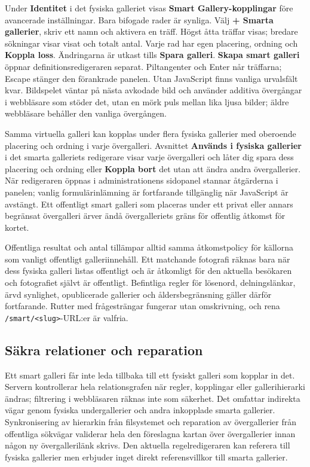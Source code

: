 \documentclass[11pt,a4paper]{article}
\newcommand{\ui}[1]{\textbf{#1}}
\begin{document}
Under \ui{Identitet} i det fysiska galleriet visas \ui{Smart Gallery-kopplingar}
före avancerade inställningar. Bara bifogade rader är synliga.
Välj \ui{+ Smarta gallerier}, skriv ett namn och aktivera en träff.
Högst åtta träffar visas; bredare sökningar visar visat och totalt antal.
Varje rad har egen placering, ordning och \ui{Koppla loss}.
Ändringarna är utkast tills \ui{Spara galleri}. \ui{Skapa smart galleri} öppnar
definitionsredigeraren separat. Piltangenter och Enter når
träffarna; Escape stänger den förankrade panelen. Utan JavaScript finns vanliga
urvalsfält kvar. Bildspelet väntar på nästa avkodade bild och använder additiva
övergångar i webbläsare som stöder det, utan en mörk puls mellan lika ljusa
bilder; äldre webbläsare behåller den vanliga övergången.

Samma virtuella galleri kan kopplas under flera fysiska gallerier med oberoende
placering och ordning i varje övergalleri. Avsnittet \ui{Används i fysiska
gallerier} i det smarta galleriets redigerare visar varje övergalleri och låter
dig spara dess placering och ordning eller \ui{Koppla bort} det utan att ändra
andra övergallerier. När redigeraren öppnas i administrationens sidopanel
stannar åtgärderna i panelen; vanlig formulärinlämning är fortfarande
tillgänglig när JavaScript är avstängt. Ett offentligt smart galleri som
placeras under ett privat eller annars begränsat övergalleri ärver ändå
övergalleriets gräns för offentlig åtkomst för kortet.

Offentliga resultat och antal tillämpar alltid samma åtkomstpolicy för källorna
som vanligt offentligt galleriinnehåll. Ett matchande fotografi räknas bara när
dess fysiska galleri listas offentligt och är åtkomligt för den aktuella
besökaren och fotografiet självt är offentligt. Befintliga regler för lösenord,
delningslänkar, ärvd synlighet, opublicerade gallerier och åldersbegränsning
gäller därför fortfarande. Rutter med frågesträngar fungerar utan omskrivning,
och rena \texttt{/smart/<slug>}-URL:er är valfria.

\subsection{Säkra relationer och reparation}

Ett smart galleri får inte leda tillbaka till ett fysiskt galleri som kopplar in
det. Servern kontrollerar hela relationsgrafen när regler, kopplingar eller
gallerihierarki ändras; filtrering i webbläsaren räknas inte som säkerhet. Det
omfattar indirekta vägar genom fysiska undergallerier och andra inkopplade
smarta gallerier. Synkronisering av hierarkin från filsystemet och reparation av
övergallerier från offentliga sökvägar validerar hela den föreslagna kartan över
övergallerier innan någon ny övergallerilänk skrivs. Den aktuella
regelredigeraren kan referera till fysiska gallerier men erbjuder inget direkt
referensvillkor till smarta gallerier.
\end{document}
